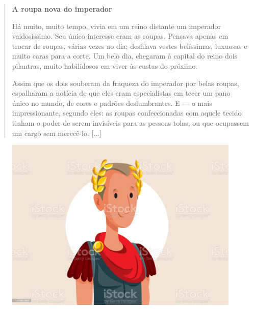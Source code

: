 
\begin{quote}
\textbf{A roupa nova do imperador}

Há muito, muito tempo, vivia em um reino distante um imperador
vaidosíssimo. Seu único interesse eram as roupas. Pensava apenas em
trocar de roupas, várias vezes ao dia; desfilava vestes belíssimas,
luxuosas e muito caras para a corte. Um belo dia, chegaram à capital do
reino dois pilantras, muito habilidosos em viver às custas do próximo.

Assim que os dois souberam da fraqueza do imperador por belas roupas,
espalharam a notícia de que eles eram especialistas em tecer um pano
único no mundo, de cores e padrões deslumbrantes. E --- o mais
impressionante, segundo eles: as roupas confeccionadas com aquele tecido
tinham o poder de serem invisíveis para as pessoas tolas, ou que
ocupassem um cargo sem merecê-lo. {[}...{]}

\end{quote}

\begin{figure}[htpb!]
\includegraphics[width=\textwidth]{media/image2.jpeg}
\end{figure}

